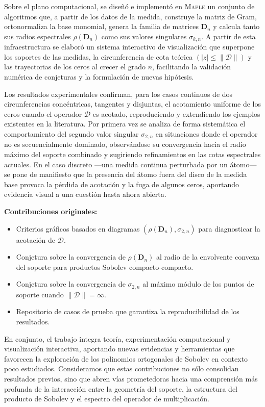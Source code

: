 Sobre el plano computacional, se diseñó e implementó en \textsc{Maple} un conjunto de algoritmos que, a partir de los datos de la medida, construye la matriz de Gram, ortonormaliza la base monomial, genera la familia de matrices \(\mathbf{D}_n\) y calcula tanto sus radios espectrales \(\rho(\mathbf{D}_n)\) como sus valores singulares \(\sigma_{k,n}\). A partir de esta infraestructura se elaboró un sistema interactivo de visualización que superpone los soportes de las medidas, la circunferencia de cota teórica \((|z|\le \|\mathcal{D}\|)\) y las trayectorias de los ceros al crecer el grado \(n\), facilitando la validación numérica de conjeturas y la formulación de nuevas hipótesis.

Los resultados experimentales confirman, para los casos continuos de dos circunferencias concéntricas, tangentes y disjuntas, el acotamiento uniforme de los ceros cuando el operador \(\mathcal{D}\) es acotado, reproduciendo y extendiendo los ejemplos existentes en la literatura. Por primera vez se analiza de forma sistemática el comportamiento del segundo valor singular \(\sigma_{2,n}\) en situaciones donde el operador no es secuencialmente dominado, observándose su convergencia hacia el radio máximo del soporte combinado y sugiriendo refinamientos en las cotas espectrales actuales. En el caso discreto —una medida continua perturbada por un átomo— se pone de manifiesto que la presencia del átomo fuera del disco de la medida base provoca la pérdida de acotación y la fuga de algunos ceros, aportando evidencia visual a una cuestión hasta ahora abierta.

\textbf{Contribuciones originales:}
\begin{itemize}
	\item Criterios gráficos basados en diagramas \((\rho(\mathbf{D}_n),\sigma_{2,n})\) para diagnosticar la acotación de \(\mathcal{D}\).
	\item Conjetura sobre la convergencia de \(\rho(\mathbf{D}_n)\) al radio de la envolvente convexa del soporte para productos Sobolev compacto-compacto.
	\item Conjetura sobre la convergencia de \(\sigma_{2,n}\) al máximo módulo de los puntos de soporte cuando \(\|\mathcal{D}\|=\infty\).
	\item Repositorio de casos de prueba que garantiza la reproducibilidad de los resultados.
\end{itemize}

En conjunto, el trabajo integra teoría, experimentación computacional y visualización interactiva, aportando nuevas evidencias y herramientas que favorecen la exploración de los polinomios ortogonales de Sobolev en contexto poco estudiados. Consideramos que estas contribuciones no sólo consolidan resultados previos, sino que abren vías prometedoras hacia una comprensión más profunda de la interacción entre la geometría del soporte, la estructura del producto de Sobolev y el espectro del operador de multiplicación.


